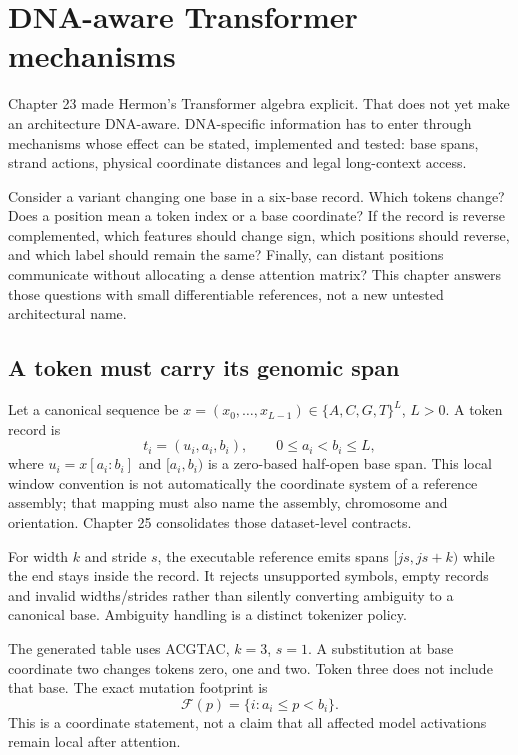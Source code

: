 \chapter{DNA-aware Transformer mechanisms}
\label{evod24:chapter}
Chapter 23 made Hermon's Transformer algebra explicit. That does not yet make an
architecture DNA-aware. DNA-specific information has to enter through mechanisms
whose effect can be stated, implemented and tested: base spans, strand actions,
physical coordinate distances and legal long-context access.

Consider a variant changing one base in a six-base record. Which tokens change?
Does a position mean a token index or a base coordinate? If the record is reverse
complemented, which features should change sign, which positions should reverse,
and which label should remain the same? Finally, can distant positions communicate
without allocating a dense attention matrix? This chapter answers those questions
with small differentiable references, not a new untested architectural name.

\section{A token must carry its genomic span}
Let a canonical sequence be $x=(x_0,\ldots,x_{L-1})\in\{A,C,G,T\}^L$, $L>0$.
A token record is
\[
t_i=(u_i,a_i,b_i),\qquad 0\le a_i<b_i\le L,
\]
where $u_i=x[a_i:b_i]$ and $[a_i,b_i)$ is a zero-based half-open base span.
This local window convention is not automatically the coordinate system of a
reference assembly; that mapping must also name the assembly, chromosome and
orientation. Chapter 25 consolidates those dataset-level contracts.

For width $k$ and stride $s$, the executable reference emits spans
$[js,js+k)$ while the end stays inside the record. It rejects unsupported symbols,
empty records and invalid widths/strides rather than silently converting ambiguity
to a canonical base. Ambiguity handling is a distinct tokenizer policy.
\begin{center}\small\end{center}
The generated table uses ACGTAC, $k=3$, $s=1$. A substitution at base coordinate
two changes tokens zero, one and two. Token three does not include that base.
The exact mutation footprint is
\[
\mathcal F(p)=\{i:a_i\le p<b_i\}.
\]
This is a coordinate statement, not a claim that all affected model activations
remain local after attention.

